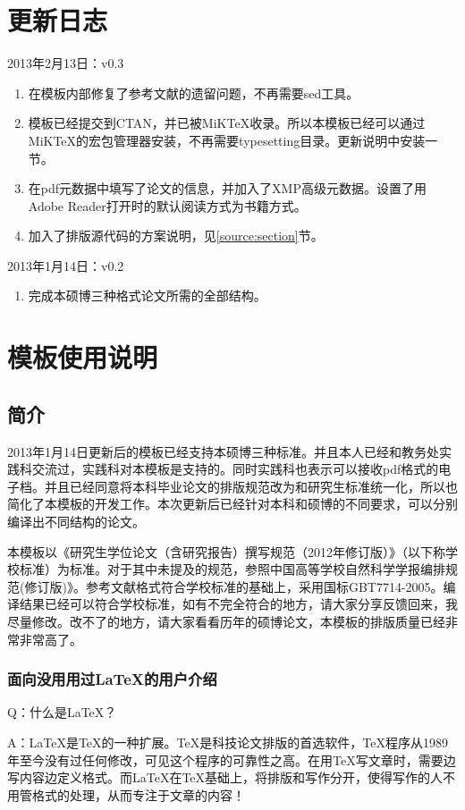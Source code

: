 
\chapter{更新日志}
\noindent
2013年2月13日：v0.3
\begin{enumerate}
\item 在模板内部修复了参考文献的遗留问题，不再需要sed工具。
\item 模板已经提交到CTAN，并已被MiKTeX收录。所以本模板已经可以通过MiKTeX的宏包管理器安装，不再需要typesetting目录。更新说明中安装一节。
\item 在pdf元数据中填写了论文的信息，并加入了XMP高级元数据。设置了用Adobe Reader打开时的默认阅读方式为书籍方式。
\item 加入了排版源代码的方案说明，见\ref{source:section}节。
\end{enumerate}

\noindent
2013年1月14日：v0.2
\begin{enumerate}
\item 完成本硕博三种格式论文所需的全部结构。
\end{enumerate}

\chapter{模板使用说明}
\section{简介}
2013年1月14日更新后的模板已经支持本硕博三种标准。并且本人已经和教务处实践科交流过，实践科对本模板是支持的。同时实践科也表示可以接收pdf格式的电子档。并且已经同意将本科毕业论文的排版规范改为和研究生标准统一化，所以也简化了本模板的开发工作。本次更新后已经针对本科和硕博的不同要求，可以分别编译出不同结构的论文。

本模板以《研究生学位论文（含研究报告）撰写规范（2012年修订版）》（以下称学校标准）为标准。对于其中未提及的规范，参照中国高等学校自然科学学报编排规范(修订版)》。参考文献格式符合学校标准的基础上，采用国标GBT7714-2005。编译结果已经可以符合学校标准，如有不完全符合的地方，请大家分享反馈回来，我尽量修改。改不了的地方，请大家看看历年的硕博论文，本模板的排版质量已经非常非常高了。
\subsection{面向没用用过\LaTeX{}的用户介绍}
    Q：什么是\LaTeX{}？

A：\LaTeX{}是\TeX{}的一种扩展。\TeX{}是科技论文排版的首选软件，\TeX{}程序从1989年至今没有过任何修改，可见这个程序的可靠性之高。在用\TeX{}写文章时，需要边写内容边定义格式。而\LaTeX{}在\TeX{}基础上，将排版和写作分开，使得写作的人不用管格式的处理，从而专注于文章的内容！


